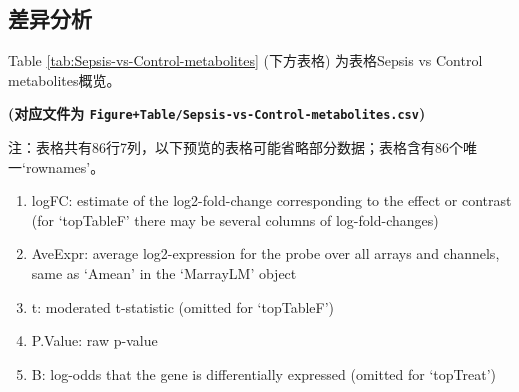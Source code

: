 \documentclass[
]{article}
\providecommand{\tightlist}{%
  \setlength{\itemsep}{0pt}\setlength{\parskip}{0pt}}
\begin{document}
\hypertarget{ux5deeux5f02ux5206ux6790}{%
\subsection{差异分析}\label{ux5deeux5f02ux5206ux6790}}

Table \ref{tab:Sepsis-vs-Control-metabolites} (下方表格) 为表格Sepsis vs Control metabolites概览。

\textbf{(对应文件为 \texttt{Figure+Table/Sepsis-vs-Control-metabolites.csv})}

\begin{center}\begin{tcolorbox}[colback=gray!10, colframe=gray!50, width=0.9\linewidth, arc=1mm, boxrule=0.5pt]注：表格共有86行7列，以下预览的表格可能省略部分数据；表格含有86个唯一`rownames'。
\end{tcolorbox}
\end{center}
\begin{center}\begin{tcolorbox}[colback=gray!10, colframe=gray!50, width=0.9\linewidth, arc=1mm, boxrule=0.5pt]\begin{enumerate}\tightlist
\item logFC:  estimate of the log2-fold-change corresponding to the effect or contrast (for ‘topTableF’ there may be several columns of log-fold-changes)
\item AveExpr:  average log2-expression for the probe over all arrays and channels, same as ‘Amean’ in the ‘MarrayLM’ object
\item t:  moderated t-statistic (omitted for ‘topTableF’)
\item P.Value:  raw p-value
\item B:  log-odds that the gene is differentially expressed (omitted for ‘topTreat’)
\end{enumerate}\end{tcolorbox}
\end{center}
\end{document}
